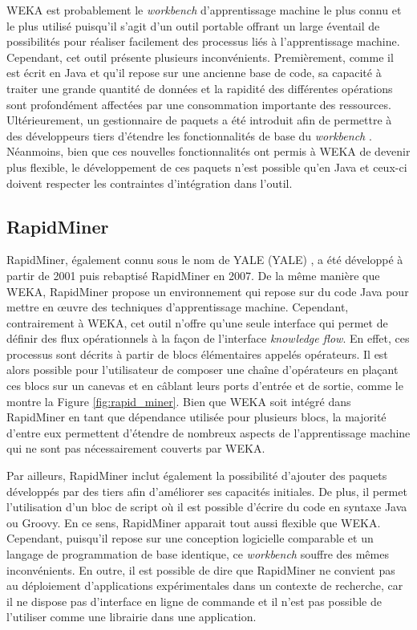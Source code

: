 \acs{WEKA} est probablement le \textit{workbench} d'apprentissage machine le plus connu et le plus utilisé puisqu'il s'agit d'un outil portable \citep{Bouckaert2010} offrant un large éventail de possibilités pour réaliser facilement des processus liés à l'apprentissage machine. Cependant, cet outil présente plusieurs inconvénients. Premièrement, comme il est écrit en Java et qu'il repose sur une ancienne base de code, sa capacité à traiter une grande quantité de données et la rapidité des différentes opérations sont profondément affectées par une consommation importante des ressources. Ultérieurement, un gestionnaire de paquets a été introduit afin de permettre à des développeurs tiers d'étendre les fonctionnalités de base du \textit{workbench} \citep{Hall2009}. Néanmoins, bien que ces nouvelles fonctionnalités ont permis à \acs{WEKA} de devenir plus flexible, le développement de ces paquets n'est possible qu'en Java et ceux-ci doivent respecter les contraintes d'intégration dans l'outil.

\subsection{RapidMiner}

RapidMiner, également connu sous le nom de \acs{YALE} (\acl{YALE}) \citep{Ritthoo2003,Hofmann2014}, a été développé à partir de 2001 puis rebaptisé RapidMiner en 2007. De la même manière que \acs{WEKA}, RapidMiner propose un environnement qui repose sur du code Java pour mettre en \oe{}uvre des techniques d'apprentissage machine. Cependant, contrairement à \acs{WEKA}, cet outil n'offre qu'une seule interface qui permet de définir des flux opérationnels à la façon de l'interface \textit{knowledge flow}. En effet, ces processus sont décrits à partir de blocs élémentaires appelés opérateurs. Il est alors possible pour l'utilisateur de composer une chaîne d'opérateurs en plaçant ces blocs sur un canevas et en câblant leurs ports d'entrée et de sortie, comme le montre la Figure \ref{fig:rapid_miner}. Bien que \acs{WEKA} soit intégré dans RapidMiner en tant que dépendance utilisée pour plusieurs blocs, la majorité d'entre eux permettent d'étendre de nombreux aspects de l'apprentissage machine qui ne sont pas nécessairement couverts par \acs{WEKA}.

Par ailleurs, RapidMiner inclut également la possibilité d'ajouter des paquets développés par des tiers afin d'améliorer ses capacités initiales. De plus, il permet l'utilisation d'un bloc de script où il est possible d'écrire du code en syntaxe Java ou Groovy. En ce sens, RapidMiner apparait tout aussi flexible que \acs{WEKA}. Cependant, puisqu'il repose sur une conception logicielle comparable et un langage de programmation de base identique, ce \textit{workbench} souffre des mêmes inconvénients. En outre, il est possible de dire que RapidMiner ne convient pas au déploiement d'applications expérimentales dans un contexte de recherche, car il ne dispose pas d'interface en ligne de commande et il n'est pas possible de l'utiliser comme une librairie dans une application.

